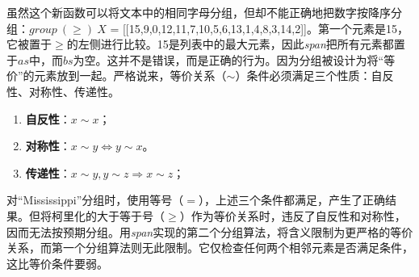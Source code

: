 \documentclass[b5paper]{ctexart}
\begin{document}
虽然这个新函数可以将文本中的相同字母分组，但却不能正确地把数字按降序分组：$\textit{group}\ (\geq)\ X$ = [[15,9,0,12,11,7,10,5,6,13,1,4,8,3,14,2]]。第一个元素是15，它被置于$\geq$的左侧进行比较。15是列表中的最大元素，因此\textit{span}把所有元素都置于$as$中，而$bs$为空。这并不是错误，而是正确的行为。因为分组被设计为将“等价”的元素放到一起。严格说来，等价关系（$\sim$）条件必须满足三个性质：自反性、对称性、传递性。

\begin{enumerate}
\item \textbf{自反性}：$x \sim x$；
\item \textbf{对称性}：$x \sim y \Leftrightarrow y \sim x$。
\item \textbf{传递性}：$x \sim y, y \sim z \Rightarrow x \sim z$；
\end{enumerate}

对``Mississippi''分组时，使用等号（$=$），上述三个条件都满足，产生了正确结果。但将柯里化的大于等于号（$\geq$）作为等价关系时，违反了自反性和对称性，因而无法按预期分组。用\textit{span}实现的第二个分组算法，将含义限制为更严格的等价关系，而第一个分组算法则无此限制。它仅检查任何两个相邻元素是否满足条件，这比等价条件要弱。

\begin{Exercise}\label{ex:list-take-drop}
\end{Exercise}
\end{document}
